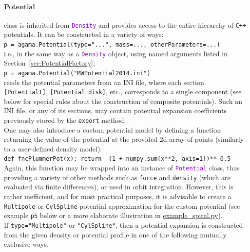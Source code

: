 \documentclass[12pt]{article}
\newcommand{\Cpp}  {\texttt{C++}\xspace}
\newcommand{\ttt}[1]{\textcolor{darkviolet}{\texttt{#1}}}
\newcommand{\ppp}[1]{\textcolor{darkolive} {\texttt{#1}}}
\let\oldparagraph\paragraph
\renewcommand{\paragraph}[1]{\vspace{-2mm}\oldparagraph{#1}}
\begin{document}
\paragraph{Potential} \label{sec:PythonPotential} class is inherited from \ttt{Density} and provides access to the entire hierarchy of \Cpp potentials. It can be constructed in a variety of ways: \\
\texttt{p = agama.Potential(type="...", mass=..., otherParameters=...)}\\
i.e., in the same way as a \ttt{Density} object, using named arguments listed in Section~\ref{sec:PotentialFactory};\\
\texttt{p = agama.Potential("MWPotential2014.ini")}\\
reads the potential parameters from an INI file, where each section \ppp{[Potential1]}, \ppp{[Potential disk]}, etc., corresponds to a single component (see below for special rules about the construction of composite potentials). Such an INI file, or any of its sections, may contain potential expansion coefficients previously stored by the \texttt{export} method. \\[2mm]
One may also introduce a custom potential model by defining a function returning the value of the potential at the provided 2d array of points (similarly to a user-defined density model):\\
\texttt{def fncPlummerPot(x): return -(1 + numpy.sum(x**2, axis=1))**-0.5}\\[1mm]
Again, this function may be wrapped into an instance of \ttt{Potential} class, thus providing a variety of other methods such as \texttt{force} and \texttt{density} (which are evaluated via finite differences), or used in orbit integration. However, this is rather inefficient, and for most practical purposes, it is advisable to create a \ppp{Multipole} or \ppp{CylSpline} potential approximation for the custom potential (see example \texttt{p5} below or a more elaborate illustration in \hyperref[sec:ExampleSpiral]{example_spiral.py}).\\[2mm]
If \ppp{type="Multipole"} or \ppp{"CylSpline"}, then a potential expansion is constructed from the given density or potential profile in one of the following mutually exclusive ways.
\end{document}
